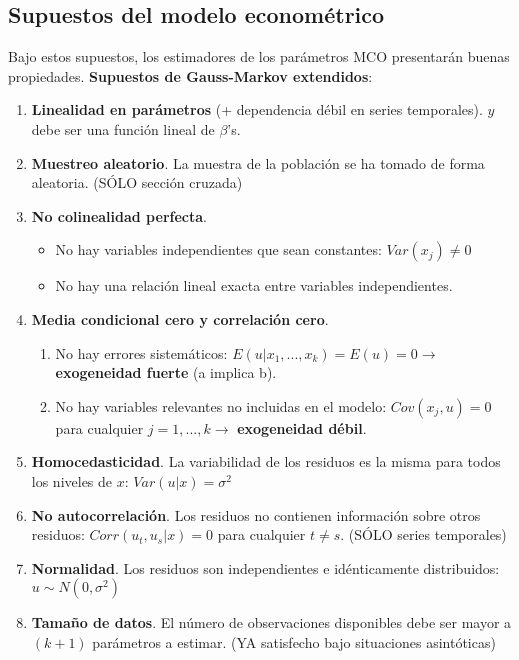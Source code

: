 \documentclass[10pt, a4paper, landscape]{extarticle}
\begin{document}
\begin{multicols}{3}
	\subsection*{Supuestos del modelo econométrico}
		Bajo estos supuestos, los estimadores de los parámetros MCO presentarán buenas propiedades. \textbf{Supuestos de Gauss-Markov extendidos}:
		\begin{enumerate}[leftmargin=*]
			\item \textbf{Linealidad en parámetros} (+ dependencia débil en series temporales). $y$ debe ser una función lineal de $\beta$'s.
			\item \textbf{Muestreo aleatorio}. La muestra de la población se ha tomado de forma aleatoria. (SÓLO sección cruzada)
			\item \textbf{No colinealidad perfecta}.
			\begin{itemize}[leftmargin=*]
				\item No hay variables independientes que sean constantes: $Var(x_j) \neq 0$
				\item No hay una relación lineal exacta entre variables independientes.
			\end{itemize}
			\item \textbf{Media condicional cero y correlación cero}.
			\begin{enumerate}[leftmargin=*, label=\alph*.]
				\item No hay errores sistemáticos: $E(u | x_1, ..., x_k) = E(u) = 0 \rightarrow$ \textbf{exogeneidad fuerte} (a implica b).
				\item No hay variables relevantes no incluidas en el modelo: $Cov(x_j , u) = 0$ para cualquier $j = 1, ..., k \rightarrow$ \textbf{exogeneidad débil}.
			\end{enumerate}
			\item \textbf{Homocedasticidad}. La variabilidad de los residuos es la misma para todos los niveles de $x$: $Var(u | x) = \sigma^2$
			\item \textbf{No autocorrelación}. Los residuos no contienen información sobre otros residuos: $Corr(u_t, u_s | x) = 0$ para cualquier $t \neq s$. (SÓLO series temporales)
			\item \textbf{Normalidad}. Los residuos son independientes e idénticamente distribuidos: $u \sim N(0,\sigma^2)$
			\item \textbf{Tamaño de datos}. El número de observaciones disponibles debe ser mayor a $(k + 1)$ parámetros a estimar. (YA satisfecho bajo situaciones asintóticas)
		\end{enumerate}

\end{multicols}
\end{document}
